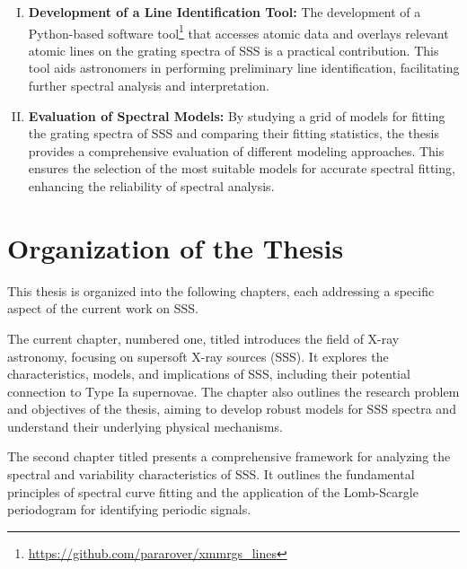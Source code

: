 \begin{enumerate}[I.]
    		\item \textbf{Development of a Line Identification Tool:} The development of a Python-based software tool\footnote{\url{https://github.com/pararover/xmmrgs_lines}} that accesses atomic data and overlays relevant atomic lines on the grating spectra of SSS is a practical contribution. This tool aids astronomers in performing preliminary line identification, facilitating further spectral analysis and interpretation.
    		
    		\item \textbf{Evaluation of Spectral Models:} By studying a grid of models for fitting the grating spectra of SSS and comparing their fitting statistics, the thesis provides a comprehensive evaluation of different modeling approaches. This ensures the selection of the most suitable models for accurate spectral fitting, enhancing the reliability of spectral analysis.
    	\end{enumerate}
    
    \section{Organization of the Thesis} \label{introduction:thesis_organization}
    	This thesis is organized into the following chapters, each addressing a specific aspect of the current work on SSS.
    	
    	The current chapter, numbered one, titled \textit{\ChapterTitleOne} introduces the field of X-ray astronomy, focusing on supersoft X-ray sources (SSS). It explores the characteristics, models, and implications of SSS, including their potential connection to Type Ia supernovae. The chapter also outlines the research problem and objectives of the thesis, aiming to develop robust models for SSS spectra and understand their underlying physical mechanisms.
    	
    	The second chapter titled \textit{\ChapterTitleTwo} presents a comprehensive framework for analyzing the spectral and variability characteristics of SSS. It outlines the fundamental principles of spectral curve fitting and the application of the Lomb-Scargle periodogram for identifying periodic signals.
    	
